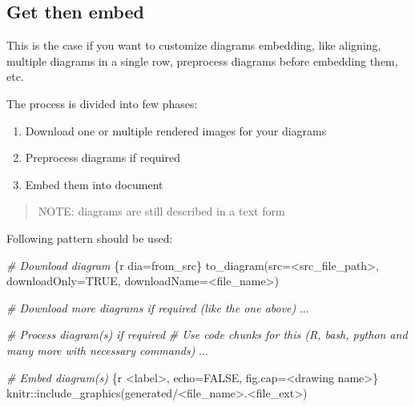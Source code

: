 \documentclass[
  12pt,
  a4paper,
  12pt,
  oneside,
  openany]{book}
\newenvironment{Shaded}{\begin{snugshade}}{\end{snugshade}}
\newcommand{\CommentTok}[1]{\textcolor[rgb]{0.37,0.37,0.37}{\textit{#1}}}
\newcommand{\DataTypeTok}[1]{\textcolor[rgb]{0.27,0.27,0.27}{#1}}
\newcommand{\NormalTok}[1]{#1}
\newcommand{\StringTok}[1]{\textcolor[rgb]{0.5,0.5,0.5}{#1}}
\providecommand{\tightlist}{%
  \setlength{\itemsep}{0pt}\setlength{\parskip}{0pt}}
\begin{document}
\hypertarget{usage-embed-getThenEmbed}{%
\subsection{Get then embed}\label{usage-embed-getThenEmbed}}

This is the case if you want to customize diagrams embedding, like aligning, multiple diagrams in a single row, preprocess diagrams before embedding them, etc.

The process is divided into few phases:

\begin{enumerate}
\tightlist
\item
  Download one or multiple rendered images for your diagrams
\item
  Preprocess diagrams if required
\item
  Embed them into document
\end{enumerate}

\begin{quote}
NOTE: diagrams are still described in a text form
\end{quote}

Following pattern should be used:

\begin{Shaded}
\begin{Highlighting}[]
\CommentTok{\# Download diagram}
\StringTok{\textasciigrave{}\textasciigrave{}\textasciigrave{}}\DataTypeTok{\{r dia=\textquotesingle{}from\_src\textquotesingle{}\}}
\DataTypeTok{  to\_diagram(src=\textquotesingle{}\textless{}src\_file\_path\textgreater{}\textquotesingle{}, downloadOnly=TRUE, downloadName=\textquotesingle{}\textless{}file\_name\textgreater{}\textquotesingle{})}
\StringTok{\textasciigrave{}\textasciigrave{}\textasciigrave{}}

\CommentTok{\# Download more diagrams if required (like the one above)}
\NormalTok{...}

\CommentTok{\# Process diagram(s) if required}
\CommentTok{\# Use code chunks for this (R, bash, python and many more with necessary commands)}
\NormalTok{...}

\CommentTok{\# Embed diagram(s)}
\StringTok{\textasciigrave{}\textasciigrave{}\textasciigrave{}}\DataTypeTok{\{r \textless{}label\textgreater{}, echo=FALSE, fig.cap=\textquotesingle{}\textless{}drawing name\textgreater{}\textquotesingle{}\}}
\DataTypeTok{  knitr::include\_graphics(\textquotesingle{}generated/\textless{}file\_name\textgreater{}.\textless{}file\_ext\textgreater{}\textquotesingle{})}
\StringTok{\textasciigrave{}\textasciigrave{}\textasciigrave{}}
\end{Highlighting}
\end{Shaded}
\end{document}
